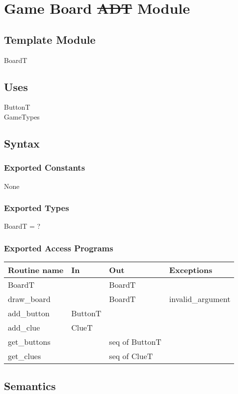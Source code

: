 \documentclass[12pt]{article}
\begin{document}
\newpage

\section* {Game Board \sout{ADT} Module}

\subsection*{Template Module}
BoardT

\subsection* {Uses}
ButtonT\\
GameTypes

\subsection* {Syntax}

\subsubsection* {Exported Constants}
None

\subsubsection* {Exported Types}
BoardT = ?

\subsubsection* {Exported Access Programs}

\begin{tabular}{| l | l | l | l |}
\hline
\textbf{Routine name} & \textbf{In} & \textbf{Out} & \textbf{Exceptions}\\
\hline
BoardT & & BoardT & \\
\hline
draw\_board &  & BoardT & invalid\_argument \\
\hline
add\_button & ButtonT & & \\
\hline
add\_clue & ClueT & & \\
\hline
get\_buttons & & seq of ButtonT & \\
\hline
get\_clues & & seq of ClueT & \\
\hline
\end{tabular}

\subsection* {Semantics}
\end{document}

